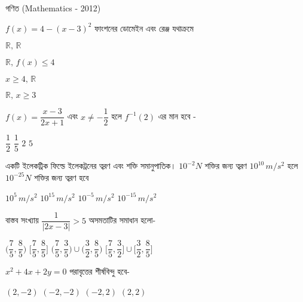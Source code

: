 \documentclass[addpoints]{exam}
\begin{document}
\begin{LARGE}
\begin{center}
গণিত (Mathematics - 2012)
\end{center}
\end{LARGE}
\begin{questions}

 \question  $ f(x)= 4-(x-3)^2 $ ফাংশনের ডোমেইন এবং রেঞ্জ যথাক্রমে

\begin{oneparchoices}
\choice $ \mathbb{R},\,\mathbb{R} $

\choice $ \mathbb{R},\,f(x)\le 4 $

\choice $ x \ge 4,\, \mathbb{R}  $

\choice $ \mathbb{R},\, x\ge 3  $

\end{oneparchoices}

\question  $ f(x) = \dfrac{x-3}{2x+1} $ এবং $ x \neq - \dfrac{1}{2} $ হলে $ f^{-1}(2) $ এর মান হবে -

\begin{oneparchoices}
\choice $ \dfrac{1}{2}$
\choice $ \dfrac{1}{5}$
\choice $ 2 $
\choice $ 5 $
\end{oneparchoices}


\question একটি ইলেকট্রিক ফিল্ডে ইলেকট্রনের ত্বরণ এবং শক্তি সমানুপাতিক। $ 10^{-2} N $ শক্তির জন্য ত্বরণ $ 10^{10}\, m/s^{2} $ হলে $ 10^{-25} N $ শক্তির জন্য ত্বরণ হবে

\begin{oneparchoices}
\choice $ 10^{5}\, m/s^{2} $
\choice $ 10^{15}\, m/s^{2} $
\choice $ 10^{-5}\, m/s^{2} $
\choice $ 10^{-15}\, m/s^{2} $

\end{oneparchoices}

\question   বাস্তব সংখ্যায় $ \dfrac{1}{|2x-3|}> 5 $ অসমতাটির সমাধান হলো-

\begin{oneparchoices}
\choice $ \Big(\dfrac{7}{5}, \dfrac{8}{5}\Big)$
\choice $ \Big[\dfrac{7}{5}, \dfrac{8}{5}\Big]$
\choice $ \Big(\dfrac{7}{5}, \dfrac{3}{5}\Big)\cup \Big(\dfrac{3}{2}, \dfrac{8}{5}\Big)  $
\choice $ \Big[\dfrac{7}{5}, \dfrac{3}{2}\Big]\cup \Big[\dfrac{3}{2}, \dfrac{8}{5}\Big]  $
\end{oneparchoices}

\question  $ x^{2}+4x+2y=0 $ পরাবৃত্তের শীর্ষবিন্দু হবে- 

\begin{oneparchoices}
\choice $ (2,-2) $
\choice $ (-2,-2) $
\choice $ (-2, 2) $
\choice $ (2, 2) $


\end{oneparchoices}
\end{questions}
\end{document}
